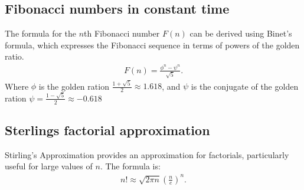 \documentclass{report}
\begin{document}
\bigbreak \noindent 
\subsection{Fibonacci numbers in constant time}
\bigbreak \noindent 
The formula for the $n$th Fibonacci number $F(n)$ can be derived using Binet's formula, which expresses the Fibonacci sequence in terms of powers of the golden ratio.
\begin{align*}
    F(n) = \frac{\phi^{n} - \psi^{n}}{\sqrt{5}}
.\end{align*}
Where $\phi$ is the golden ration $\frac{1+\sqrt{5}}{2} \approx 1.618 $, and $\psi$ is the conjugate of the golden ration $\psi = \frac{1- \sqrt{5}}{2} \approx -0.618 $

\bigbreak \noindent 
\subsection{Sterlings factorial approximation}
\bigbreak \noindent 
Stirling's Approximation provides an approximation for factorials, particularly useful for large values of $n$. The formula is:
\begin{align*}
    n! \approx  \sqrt{2\pi n}\left(\frac{n}{e}\right)^{n}
.\end{align*}
\end{document}
